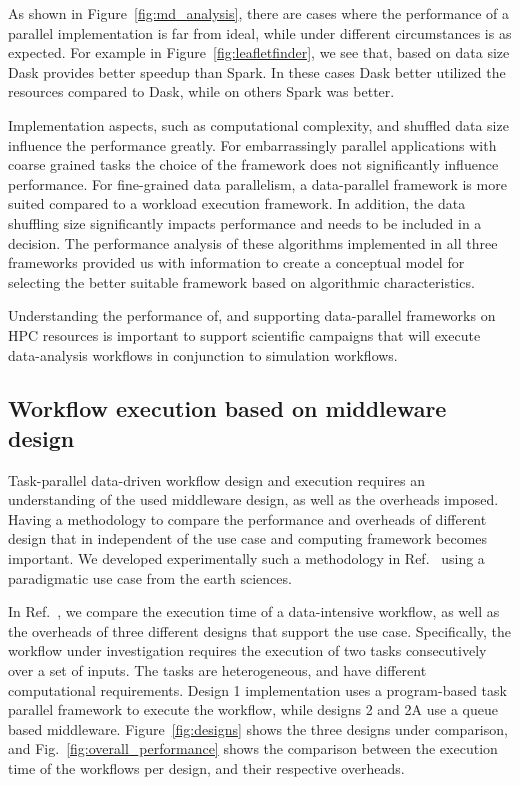 As shown in Figure~\ref{fig:md_analysis}, there are cases where the performance of a parallel implementation is far from ideal, while under different circumstances is as expected. 
For example in Figure~\ref{fig:leafletfinder}, we see that, based on data size Dask provides better speedup than Spark. 
In these cases Dask better utilized the resources compared to Dask, while on others Spark was better.

Implementation aspects, such as computational complexity, and shuffled data size influence the performance greatly. 
For embarrassingly parallel applications with coarse grained tasks the choice of the framework does not significantly influence performance. 
For fine-grained data parallelism, a data-parallel framework is more suited compared to a workload execution framework. 
In addition, the data shuffling size significantly impacts performance and needs to be included in a decision.
The performance analysis of these algorithms implemented in all three frameworks provided us with information to create a conceptual model for selecting the better suitable framework based on algorithmic characteristics.

Understanding the performance of, and supporting data-parallel frameworks on HPC resources is important to support scientific campaigns that will execute data-analysis workflows in conjunction to simulation workflows.

\subsection{Workflow execution based on middleware design}
\label{design_comp}
Task-parallel data-driven workflow design and execution requires an understanding of the used middleware design, as well as the overheads imposed.
Having a methodology to compare the performance and overheads of different design that in independent of the use case and computing framework becomes important.
We developed experimentally such a methodology in Ref.~\cite{paraskevakos2019workflow} using a paradigmatic use case from the earth sciences.

In Ref.~\cite{paraskevakos2019workflow}, we compare the execution time of a data-intensive workflow, as well as the overheads of three different designs that support the use case.
Specifically, the workflow under investigation requires the execution of two tasks consecutively over a set of inputs. 
The tasks are heterogeneous, and have different computational requirements. 
Design 1 implementation uses a program-based task parallel framework to execute the workflow, while designs 2 and 2A use a queue based middleware.
Figure~\ref{fig:designs} shows the three designs under comparison, and Fig.~\ref{fig:overall_performance} shows the comparison between the execution time of the workflows per design, and their respective overheads.


